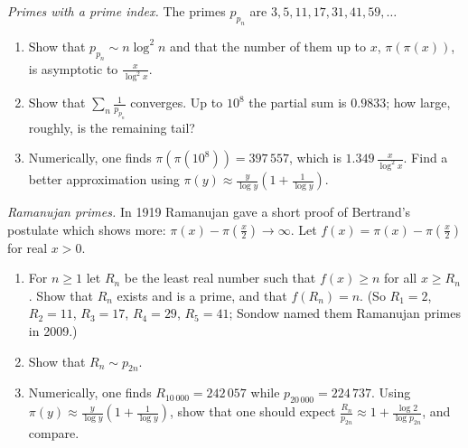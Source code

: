 \begin{exercise}[$\star$]\label{pb:superprimes}
\emph{Primes with a prime index.} The primes $p_{p_n}$ are $3,5,11,17,31,41,59,\dots$
\begin{enumerate}[label=(\alph*)]
\item Show that $p_{p_n}\sim n\log^2n$ and that the number of them up to $x$, $\pi(\pi(x))$, is asymptotic to $\frac x{\log^2x}$.
\item Show that $\sum_n\frac1{p_{p_n}}$ converges. Up to $10^8$ the partial sum is $0.9833$; how large, roughly, is the remaining tail?
\item Numerically, one finds $\pi(\pi(10^8))=397\,557$, which is $1.349\,\frac x{\log^2x}$. Find a better approximation using $\pi(y)\approx\frac y{\log y}(1+\frac1{\log y})$.
\end{enumerate}
\end{exercise}

\begin{exercise}[$\star\star$]\label{pb:ramprimes}
\emph{Ramanujan primes.} In 1919 Ramanujan gave a short proof of Bertrand's postulate which shows more: $\pi(x)-\pi(\frac x2)\to\infty$. Let $f(x)=\pi(x)-\pi(\frac x2)$ for real $x>0$.
\begin{enumerate}[label=(\alph*)]
\item For $n\ge1$ let $R_n$ be the least real number such that $f(x)\ge n$ for all $x\ge R_n$. Show that $R_n$ exists and is a prime, and that $f(R_n)=n$.
(So $R_1=2$, $R_2=11$, $R_3=17$, $R_4=29$, $R_5=41$; Sondow named them Ramanujan primes in 2009.)
\item Show that $R_n\sim p_{2n}$.
\item Numerically, one finds $R_{10\,000}=242\,057$ while $p_{20\,000}=224\,737$. Using $\pi(y)\approx\frac y{\log y}(1+\frac1{\log y})$, show that one should expect
$\frac{R_n}{p_{2n}}\approx1+\frac{\log2}{\log p_{2n}}$, and compare.
\end{enumerate}
\end{exercise}

